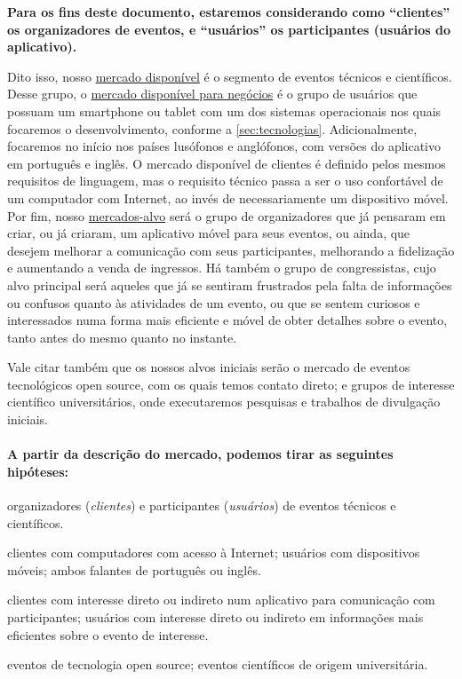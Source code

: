\documentclass[12pt,a4paper,twoside,hyphens,english,brazil]{abntex2}
\newcommand{\hip}{{\color{BlueViolet}\framebox[1.1\width]{HIP}}}
\begin{document}
\textbf{Para os fins deste documento, estaremos considerando como ``clientes'' os organizadores de eventos, e ``usuários'' os participantes (usuários do aplicativo).}

Dito isso, nosso \underline{mercado disponível} é o segmento de eventos técnicos e científicos.\\
Desse grupo, o \underline{mercado disponível para negócios} é o grupo de usuários que possuam um smartphone ou tablet com um dos sistemas operacionais nos quais focaremos o desenvolvimento, conforme a \autoref{sec:tecnologias}. Adicionalmente, focaremos no início nos países lusófonos e anglófonos, com versões do aplicativo em português e inglês. O mercado disponível de clientes é definido pelos mesmos requisitos de linguagem, mas o requisito técnico passa a ser o uso confortável de um computador com Internet, ao invés de necessariamente um dispositivo móvel.\\
Por fim, nosso \underline{mercados-alvo} será o grupo de organizadores que já pensaram em criar, ou já criaram, um aplicativo móvel para seus eventos, ou ainda, que desejem melhorar a comunicação com seus participantes, melhorando a fidelização e aumentando a venda de ingressos. Há também o grupo de congressistas, cujo alvo principal será aqueles que já se sentiram frustrados pela falta de informações ou confusos quanto às atividades de um evento, ou que se sentem curiosos e interessados numa forma mais eficiente e móvel de obter detalhes sobre o evento, tanto antes do mesmo quanto no instante.


Vale citar também que os nossos alvos iniciais serão o mercado de eventos tecnológicos open source, com os quais temos contato direto; e grupos de interesse científico universitários, onde executaremos pesquisas e trabalhos de divulgação iniciais.

\paragraph*{\protect\hip{} A partir da descrição do mercado, podemos tirar as seguintes hipóteses:}
\begin{description}[itemsep=-1ex]
	\item[Mercado] organizadores (\textit{clientes}) e participantes (\textit{usuários}) de eventos técnicos e científicos.
	\item[Mercado disponível] clientes com computadores com acesso à Internet; usuários com dispositivos móveis; ambos falantes de português ou inglês.
	\item[Mercado-alvo] clientes com interesse direto ou indireto num aplicativo para comunicação com participantes; usuários com interesse direto ou indireto em informações mais eficientes sobre o evento de interesse.
	\item[Mercado-alvo primário] eventos de tecnologia open source; eventos científicos de origem universitária.
\end{description}
\end{document}
